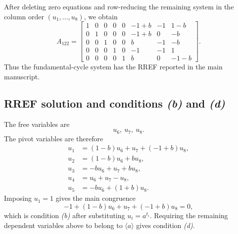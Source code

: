 \documentclass[11pt]{article}
\newcommand{\SpanA}{\langle a\rangle}
\begin{document}
After deleting zero equations and row-reducing the remaining system in the column order $(u_1,\ldots,u_8)$, we obtain
\[
A_{122}=
\begin{bmatrix}
1 & 0 & 0 & 0 & 0 & -1 + b & -1 & 1 - b \\
0 & 1 & 0 & 0 & 0 & -1 + b & 0 & -b \\
0 & 0 & 1 & 0 & 0 & b & -1 & -b \\
0 & 0 & 0 & 1 & 0 & -1 & -1 & 1 \\
0 & 0 & 0 & 0 & 1 & b & 0 & -1 - b
\end{bmatrix}.
\]
Thus the fundamental-cycle system has the RREF reported in the main manuscript.

\subsection{RREF solution and conditions \emph{(b)} and \emph{(d)}}
The free variables are
\[
u_{6},\ u_{7},\ u_{8}.
\]
The pivot variables are therefore
\[
\begin{aligned}
u_{1}&=\left(1 - b\right)u_{6} + u_{7} + \left(-1 + b\right)u_{8},\\
u_{2}&=\left(1 - b\right)u_{6} + bu_{8},\\
u_{3}&=-bu_{6} + u_{7} + bu_{8},\\
u_{4}&=u_{6} + u_{7} - u_{8},\\
u_{5}&=-bu_{6} + \left(1 + b\right)u_{8}.
\end{aligned}
\]
Imposing $u_1=1$ gives the main congruence
\[
-1 + \left(1 - b\right)u_{6} + u_{7} + \left(-1 + b\right)u_{8}=0,
\]
which is condition \emph{(b)} after substituting $u_i=a^{t_i}$.  Requiring the remaining dependent variables above to belong to $\SpanA$ gives condition \emph{(d)}.
\end{document}
